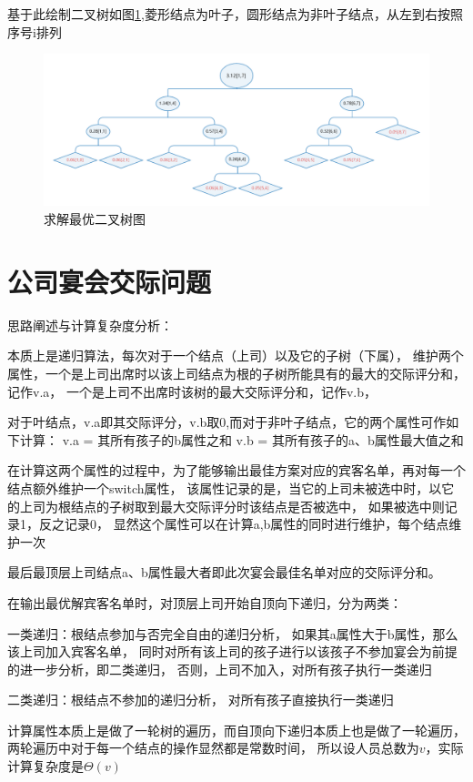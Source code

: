 \documentclass[cn,11pt,chinese]{elegantbook}
\begin{document}
基于此绘制二叉树如图\ref{Ch6S3_map},菱形结点为叶子，圆形结点为非叶子结点，从左到右按照序号i排列
\begin{figure}[htbp]
	\centering
	\includegraphics[width=\textwidth]{image/Ch6S3_map.png}
	\caption{求解最优二叉树图}
  \label{Ch6S3_map}
\end{figure}


\section{公司宴会交际问题}

思路阐述与计算复杂度分析：

本质上是递归算法，每次对于一个结点（上司）以及它的子树（下属），
维护两个属性，一个是上司出席时以该上司结点为根的子树所能具有的最大的交际评分和，记作v.a，
一个是上司不出席时该树的最大交际评分和，记作v.b，

对于叶结点，v.a即其交际评分，v.b取0,而对于非叶子结点，它的两个属性可作如下计算：
v.a = 其所有孩子的b属性之和
v.b = 其所有孩子的a、b属性最大值之和

在计算这两个属性的过程中，为了能够输出最佳方案对应的宾客名单，再对每一个结点额外维护一个switch属性，
该属性记录的是，当它的上司未被选中时，以它的上司为根结点的子树取到最大交际评分时该结点是否被选中，
如果被选中则记录1，反之记录0，
显然这个属性可以在计算a,b属性的同时进行维护，每个结点维护一次

最后最顶层上司结点a、b属性最大者即此次宴会最佳名单对应的交际评分和。

在输出最优解宾客名单时，对顶层上司开始自顶向下递归，分为两类：

一类递归：根结点参加与否完全自由的递归分析，
如果其a属性大于b属性，那么该上司加入宾客名单，
同时对所有该上司的孩子进行以该孩子不参加宴会为前提的进一步分析，即二类递归，
否则，上司不加入，对所有孩子执行一类递归

二类递归：根结点不参加的递归分析，
对所有孩子直接执行一类递归

计算属性本质上是做了一轮树的遍历，而自顶向下递归本质上也是做了一轮遍历，两轮遍历中对于每一个结点的操作显然都是常数时间，
所以设人员总数为$v$，实际计算复杂度是$\Theta(v)$
\end{document}
